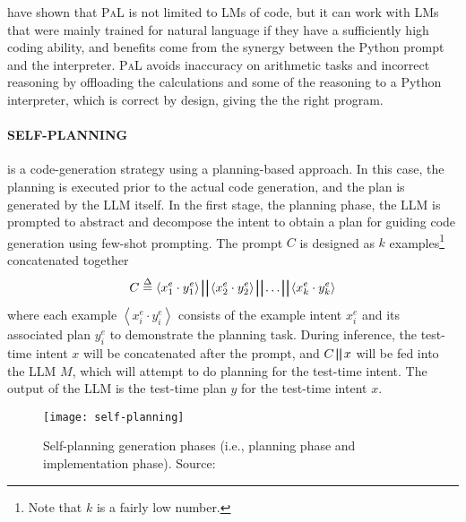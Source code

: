 \textcite{gao2022pal} have shown that \textsc{PaL} is not limited to LMs of code, but it can work with LMs that were mainly trained for natural language if they have a sufficiently high coding ability, and benefits come from the synergy between the Python prompt and the interpreter.
\textsc{PaL} avoids inaccuracy on arithmetic tasks and incorrect reasoning by offloading the calculations and some of the reasoning to a Python interpreter, which is correct by design, giving the the right program.

\paragraph{SELF-PLANNING}
\label{par:self-planning}

is a code-generation strategy using a planning-based approach.
In this case, the planning is executed prior to the actual code generation, and the plan is generated by the LLM itself.
In the first stage, the planning phase, the LLM is prompted to abstract and decompose the intent to obtain a plan for guiding code generation using few-shot prompting.
The prompt $C$ is designed as $k$ examples\footnote{Note that $k$ is a fairly low number.} concatenated together
\begin{equation}
	C \stackrel{\Delta}{=} \left\langle x^e_1 \cdot y^e_1 \right\rangle \bigparallel \left\langle x^e_2 \cdot y^e_2 \right\rangle \bigparallel \ldots \bigparallel \left\langle x^e_k \cdot y^e_k \right\rangle
	\label{eq:self-planning-eq}
\end{equation}
where each example $\left\langle x^e_i \cdot y^e_i \right\rangle$ consists of the example intent $x^e_i$ and its associated plan $y^e_i$ to demonstrate the planning task.
During inference, the test-time intent $x$ will be concatenated after the prompt, and $C \bigparallel x$ will be fed into the LLM $M$, which will attempt to do planning for the test-time intent.
The output of the LLM is the test-time plan $y$ for the test-time intent $x$.

\begin{figure}[h!]
	\centering
	\texttt{[image: self-planning]}
	\caption{Self-planning generation phases (i.e., planning phase and implementation phase). Source: \textcite{jiang2024selfplanning}}
	\label{fig:self-planning}
\end{figure}

